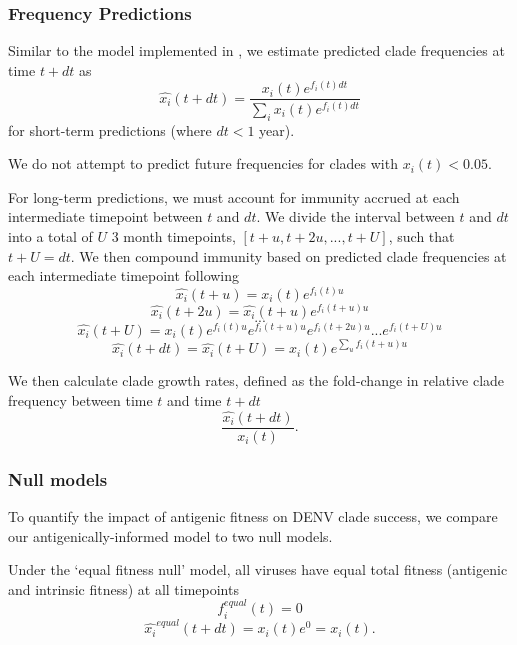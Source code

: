\documentclass[11pt,oneside,letterpaper]{article}
\begin{document}
\subsubsection*{Frequency Predictions}
Similar to the model implemented in \citet{luksza2014predictive}, we estimate predicted clade frequencies at time $t + dt$ as
\begin{equation}
  \label{eq_predict_frequency}
\hat{x_i}(t+dt) = \frac{x_i(t) e^{f_i(t) dt}}{\sum_{i}x_i(t) e^{f_i(t) dt}}
\end{equation}
for short-term predictions (where $dt < 1$ year).

We do not attempt to predict future frequencies for clades with $x_i(t) < 0.05$.

For long-term predictions, we must account for immunity accrued at each intermediate timepoint between $t$ and $dt$.
We divide the interval between $t$ and $dt$ into a total of $U$ 3 month timepoints, $[t+u, t+2u, ..., t+U]$, such that $t+U=dt$.
We then compound immunity based on predicted clade frequencies at each intermediate timepoint following
\begin{equation}
\hat{x_i}(t+u) = x_i(t)e^{f_i(t) u}
\end{equation}
\begin{equation}
\hat{x_i}(t+2u) = \hat{x_i}(t+u) e^{f_i(t+u)u}
\end{equation}
$$...$$
\begin{equation}
\hat{x_i}(t+U) = x_i(t) e^{f_i(t)u} e^{f_i(t+u)u} e^{f_i(t+2u)u} ... e^{f_i(t+U)u}
\end{equation}
\begin{equation}
  \label{eq_compounding_immunity}
\hat{x_i}(t+dt) = \hat{x_i}(t+U) = x_i(t) e^{\sum_{u}f_i(t+u)u}
\end{equation}

We then calculate clade growth rates, defined as the fold-change in relative clade frequency between time $t$ and time $t+dt$
\begin{equation}
  \label{eq_growth_rate}
\frac{\hat{x_i}(t+dt)}{x_i(t)}.
\end{equation}

\subsubsection*{Null models}
To quantify the impact of antigenic fitness on DENV clade success, we compare our antigenically-informed model to two null models.

Under the `equal fitness null' model, all viruses have equal total fitness (antigenic and intrinsic fitness) at all timepoints
\begin{equation}
  \label{equal_null}
f_i^{equal}(t) = 0
\end{equation}
\begin{equation}
\hat{x_i}^{equal}(t+dt) = x_i(t) e^0 = x_i(t).
\end{equation}
\end{document}
